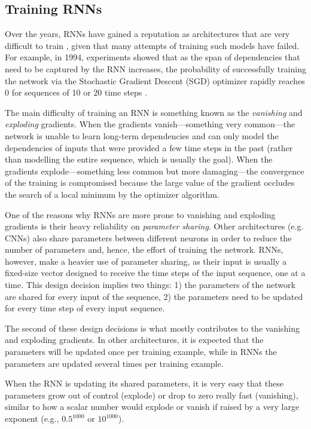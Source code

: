 \subsection{Training RNNs}

Over the years, RNNs have gained a reputation as architectures that are very difficult to train \cite{pascanu2013difficulty}, given that many attempts of training such models have failed. For example, in 1994, experiments showed that as the span of dependencies that need to be captured by the RNN increases, the probability of successfully training the network via the Stochastic Gradient Descent (SGD) optimizer rapidly reaches 0 for sequences of 10 or 20 time steps \cite{bengio1994learning}. 

The main difficulty of training an RNN is something known as the \emph{vanishing} and \emph{exploding} gradients. When the gradients vanish---something very common---the network is unable to learn long-term dependencies and can only model the dependencies of inputs that were provided a few time steps in the past (rather than modelling the entire sequence, which is usually the goal). When the gradients explode---something less common but more damaging---the convergence of the training is compromised because the large value of the gradient occludes the search of a local minimum by the optimizer algorithm.

One of the reasons why RNNs are more prone to vanishing and exploding gradients is their heavy reliability on \emph{parameter sharing}. Other architectures (e.g. CNNs) also share parameters between different neurons in order to reduce the number of parameters and, hence, the effort of training the network. RNNs, however, make a heavier use of parameter sharing, as their input is usually a fixed-size vector designed to receive the time steps of the input sequence, one at a time. This design decision implies two things: 1) the parameters of the network are shared for every input of the sequence, 2) the parameters need to be updated for every time step of every input sequence.

The second of these design decisions is what mostly contributes to the vanishing and exploding gradients. In other architectures, it is expected that the parameters will be updated once per training example, while in RNNs the parameters are updated several times per training example. 

When the RNN is updating its shared parameters, it is very easy that these parameters grow out of control (explode) or drop to zero really fast (vanishing), similar to how a scalar number would explode or vanish if raised by a very large exponent (e.g., $0.5^{1000}$ or $10^{1000}$).

